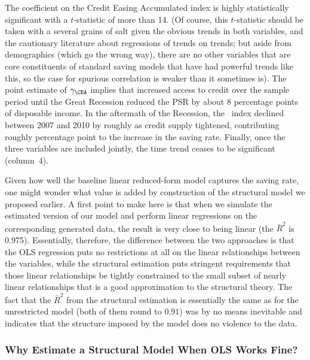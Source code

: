 \documentclass[titlepage]{\econtex}
\begin{document}
The coefficient on the Credit Easing Accumulated index is highly statistically significant with a $t$-statistic of more than 14. (Of course, this $t$-statistic should be taken with a several grains of salt given the obvious trends in both variables, and the cautionary literature about regressions of trends on trends; but aside from demographics (which go the wrong way), there are no other variables that are core constituents of standard saving models that have had powerful trends like this, so the case for spurious correlation is weaker than it sometimes is).  The point estimate of $\gamma _{\CEA}$ implies that increased access to credit over the sample period until the Great Recession reduced the PSR by about 8 percentage points of disposable income. In the aftermath of the Recession, the \CEA\ index declined between 2007 and 2010 by roughly  as credit supply tightened, contributing roughly  percentage point to the increase in the saving rate.  Finally, once the three variables are included jointly, the time trend ceases to be significant (column~4).

Given how well the baseline linear reduced-form model captures the saving rate, one might wonder what value is added by construction of the structural model we proposed earlier.  A first point to make here is that when we simulate the estimated version of our model and perform linear regressions on the corresponding generated data, the result is very close to being linear (the $\bar{R}^{2}$ is 0.975).  Essentially, therefore, the difference between the two approaches is that the OLS regression puts no restrictions at all on the linear relationships between the variables, while the structural estimation puts stringent requirements that those linear relationships be tightly constrained to the small subset of nearly linear relationships that is a good approximation to the structural theory.  The fact that the $\bar{R}^{2}$ from the structural estimation is essentially the same as for the unrestricted model (both of them round to $0.91$) was by no means inevitable and indicates that the structure imposed by the model does no violence to the data.%

\hypertarget{Why-Estimate-a-Structural-Model}{}

\subsubsection{Why Estimate a Structural Model When OLS Works Fine?}
\end{document}
